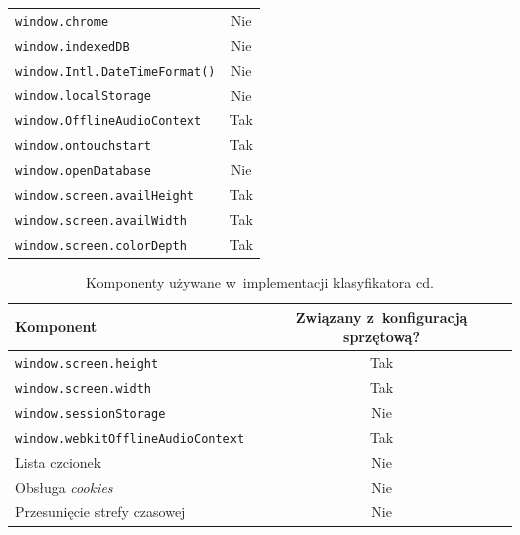 \begin{table}
\begin{tabular}{|l|c|}
		\texttt{window.chrome}                      & Nie                                    \\
		\texttt{window.indexedDB}                   & Nie                                    \\
		\texttt{window.Intl.DateTimeFormat()}       & Nie                                    \\
		\texttt{window.localStorage}                & Nie                                    \\
		\texttt{window.OfflineAudioContext}         & Tak                                    \\
		\texttt{window.ontouchstart}                & Tak                                    \\
		\texttt{window.openDatabase}                & Nie                                    \\
		\texttt{window.screen.availHeight}          & Tak                                    \\
		\texttt{window.screen.availWidth}           & Tak                                    \\
		\texttt{window.screen.colorDepth}           & Tak                                    \\
		\hline
	\end{tabular}
\end{table}

\begin{table}
	\centering
	\caption{Komponenty używane w~implementacji klasyfikatora cd.}
	\begin{tabular}{|l|c|}
		\hline
		Komponent                                 & Związany z~konfiguracją sprzętową? \\
		\hline
		\texttt{window.screen.height}             & Tak                                    \\
		\texttt{window.screen.width}              & Tak                                    \\
		\texttt{window.sessionStorage}            & Nie                                    \\
		\texttt{window.webkitOfflineAudioContext} & Tak                                    \\
		Lista czcionek                            & Nie                                    \\
		Obsługa \emph{cookies}                   & Nie                                    \\
		Przesunięcie strefy czasowej             & Nie                                    \\
		\hline
	\end{tabular}
\end{table}

